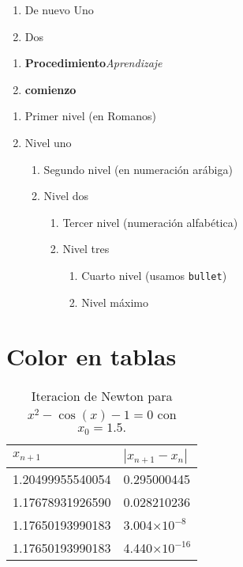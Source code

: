 \documentclass{article}
\begin{document}
\begin{enumerate}[label=\textbf{Idea (\emph{\alph*})}, leftmargin=2cm]
	\item De nuevo Uno
	\item Dos
\end{enumerate}

\begin{enumerate}
	\item[\fbox{1.}] {\bf Procedimiento}{\em Aprendizaje}
	\item[\fbox{2.}] {\bf comienzo} %
\end{enumerate}

\newpage
\begin{enumerate}[label=\emph{\Roman*})]
	\item Primer nivel (en Romanos)
	\item Nivel uno

	\begin{enumerate}[label=\emph{\arabic*})]
		\item Segundo nivel (en numeración arábiga)
		\item Nivel dos

		\begin{enumerate}[label=\emph{\alph*})]
			\item Tercer nivel (numeración alfabética)
			\item Nivel tres


			\begin{enumerate}[label=\emph{$\bullet$})]
				\item Cuarto nivel (usamos {\tt bullet})
				\item Nivel máximo
			\end{enumerate}
		\end{enumerate}
	\end{enumerate}	
\end{enumerate}

\section{Color en tablas}
\begin{table}[h!]
\centering
{}
\begin{tabular}{ll}
\rowcolor{LightBlue2} $x_{n+1}$ & $|x_{n+1}-x_n|$\\ \hline
1.20499955540054 & 0.295000445\\
1.17678931926590 & 0.028210236\\
1.17650193990183 & 3.004$\times10^{-8}$\\
1.17650193990183 & 4.440$\times10^{-16}$\\ \hline
\end{tabular}
\caption{Iteracion de Newton para $x^2-\cos(x)-1=0$ con $x_0=1.5.$}
\end{table}
\end{document}
